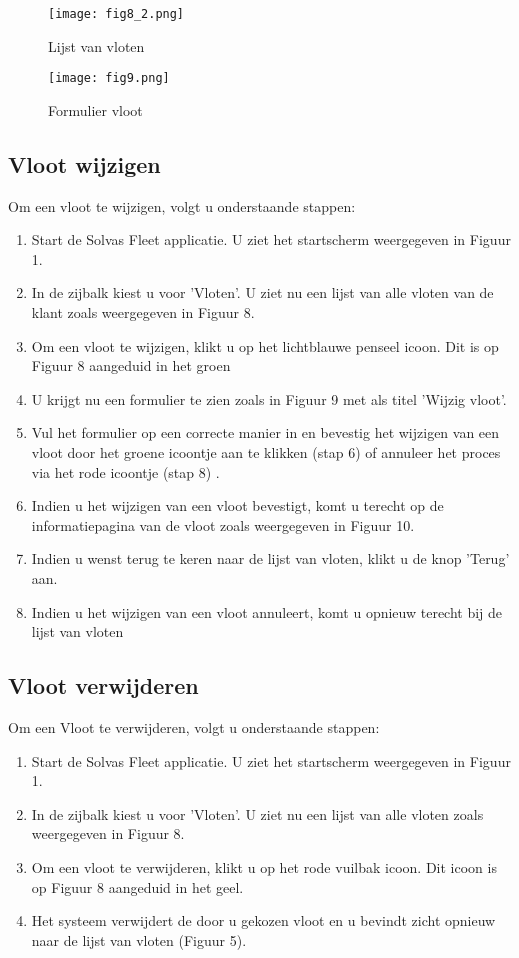 \documentclass[11pt,openany]{article}
\begin{document}
\begin{figure}
	\centering
	\texttt{[image: fig8\_2.png]}
	\caption{Lijst van vloten}
\end{figure}

\begin{figure}
	\centering
	\texttt{[image: fig9.png]}
	\caption{Formulier vloot}
\end{figure}
\newpage

\subsection{Vloot wijzigen}
Om een vloot te wijzigen, volgt u onderstaande stappen:
\begin{enumerate}
	\item Start de Solvas Fleet applicatie. U ziet het startscherm weergegeven in Figuur 1.
	\item In de zijbalk kiest u voor 'Vloten'. U ziet nu een lijst van alle vloten van de klant zoals weergegeven in Figuur 8.
	\item Om een vloot te wijzigen, klikt u op het lichtblauwe penseel icoon. Dit is op Figuur 8 aangeduid in het groen
	\item U krijgt nu een formulier te zien zoals in Figuur 9 met als titel 'Wijzig vloot'.
	\item Vul het formulier op een correcte manier in en bevestig het wijzigen van een vloot door het groene icoontje aan te klikken (stap 6) of annuleer het proces via het rode icoontje (stap 8) .
	\item Indien u het wijzigen van een vloot bevestigt, komt u terecht op de informatiepagina van de vloot zoals weergegeven in Figuur 10. 
	\item Indien u wenst terug te keren  naar de lijst van vloten, klikt u de knop 'Terug' aan.
	\item Indien u het wijzigen van een vloot annuleert, komt u opnieuw terecht bij de lijst van vloten 
\end{enumerate}

\subsection{Vloot verwijderen}
Om een Vloot te verwijderen, volgt u onderstaande stappen:
\begin{enumerate}
	\item Start de Solvas Fleet applicatie. U ziet het startscherm weergegeven in Figuur 1.
	\item In de zijbalk kiest u voor 'Vloten'. U ziet nu een lijst van alle vloten zoals weergegeven in Figuur 8.
	\item Om een vloot te verwijderen, klikt u op het rode vuilbak icoon. Dit icoon is op Figuur 8 aangeduid in het geel.
	\item Het systeem verwijdert de door u gekozen vloot en u bevindt zicht opnieuw naar de lijst van vloten (Figuur 5).
\end{enumerate}
\end{document}
